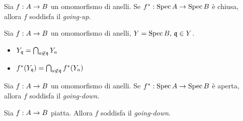 \begin{proposition}
Sia $f:A\rightarrow B$ un omomorfismo di anelli. Se $f^*:\operatorname{Spec} A\rightarrow \operatorname{Spec} B$ è chiusa, allora $f$ soddisfa il \emph{going-up}.
\end{proposition}
\begin{proposition}
Sia $f:A\rightarrow B$ un omomorfismo di anelli, $Y=\operatorname{Spec} B,\,\allowbreak\mathfrak{q}\in Y$.
\begin{itemize}
\item $Y_{\mathfrak{q}}=\bigcap_{a\not\in\mathfrak{q}}Y_a$
\item $f^*(Y_{\mathfrak{q}})=\bigcap_{a\not\in\mathfrak{q}}f^*(Y_a)$
\end{itemize}
\end{proposition}
\begin{proposition}
Sia $f:A\rightarrow B$ un omomorfismo di anelli. Se $f^*:\operatorname{Spec} A\rightarrow \operatorname{Spec} B$ è aperta, allora $f$ soddisfa il \emph{going-down}.
\end{proposition}
\begin{proposition}
Sia $f:A\rightarrow B$ piatta. Allora $f$ soddisfa il \emph{going-down}.
\end{proposition}






